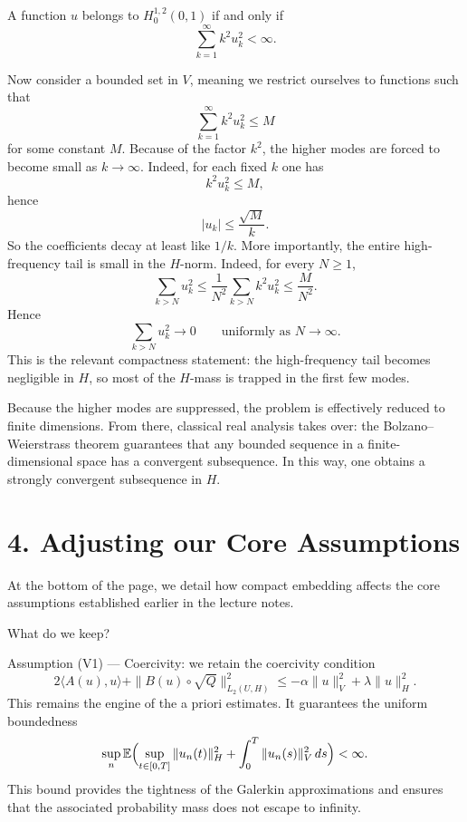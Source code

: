 \documentclass[11pt]{article}
\theoremstyle{definition}
\theoremstyle{remark}
\begin{document}
A function $u$ belongs to $H_0^{1,2}(0,1)$ if and only if
\[
  \sum_{k=1}^{\infty} k^2 u_k^2 < \infty.
\]

Now consider a bounded set in $V$, meaning we restrict ourselves to functions such that
\[
  \sum_{k=1}^{\infty} k^2 u_k^2 \le M
\]
for some constant $M$. Because of the factor $k^2$, the higher modes are forced to become small as $k\to\infty$. Indeed, for each fixed $k$ one has
\[
  k^2 u_k^2 \le M,
\]
hence
\[
  |u_k| \le \frac{\sqrt{M}}{k}.
\]
So the coefficients decay at least like $1/k$. More importantly, the entire high-frequency tail is small in the $H$-norm. Indeed, for every $N\ge 1$,
\[
  \sum_{k>N} u_k^2
  \le \frac{1}{N^2}\sum_{k>N} k^2 u_k^2
  \le \frac{M}{N^2}.
\]
Hence
\[
  \sum_{k>N} u_k^2 \to 0
  \qquad \text{uniformly as } N\to\infty.
\]
This is the relevant compactness statement: the high-frequency tail becomes negligible in $H$, so most of the $H$-mass is trapped in the first few modes.

Because the higher modes are suppressed, the problem is effectively reduced to finite dimensions. From there, classical real analysis takes over: the Bolzano--Weierstrass theorem guarantees that any bounded sequence in a finite-dimensional space has a convergent subsequence. In this way, one obtains a strongly convergent subsequence in $H$.

\section*{4. Adjusting our Core Assumptions}
At the bottom of the page, we detail how compact embedding affects the core assumptions established earlier in the lecture notes.

What do we keep?

Assumption (V1) --- Coercivity: we retain the coercivity condition
\[
  2\langle A(u),u\rangle + \|B(u)\circ \sqrt{Q}\|_{L_2(U,H)}^2
  \le -\alpha \|u\|_V^2 + \lambda \|u\|_H^2.
\]
This remains the engine of the a priori estimates. It guarantees the uniform boundedness
\[
  \sup_n \mathbb{E}\Bigl(\sup_{t\in[0,T]}\|u_n(t)\|_H^2 + \int_0^T \|u_n(s)\|_V^2\,ds\Bigr)<\infty.
\]
This bound provides the tightness of the Galerkin approximations and ensures that the associated probability mass does not escape to infinity.
\end{document}
